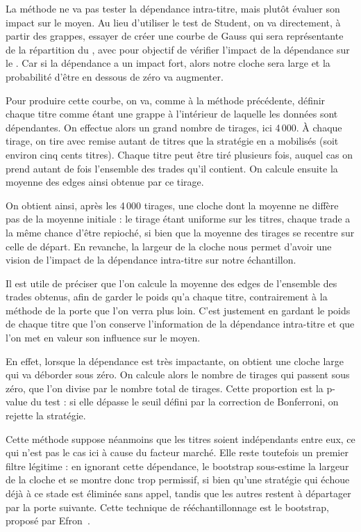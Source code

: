 La méthode ne va pas tester la dépendance intra-titre,
mais plutôt évaluer son impact sur le \edgevar{} moyen.
Au lieu d'utiliser le test de Student, on va directement, à partir des
grappes, essayer de créer une courbe de Gauss qui sera représentante de la
répartition du \edgevar{}, avec pour objectif de vérifier l'impact de la dépendance
sur le \edgevar{}. Car si la dépendance a un impact fort, alors notre cloche sera
large et la probabilité d'être en dessous de zéro va augmenter.

Pour produire cette courbe, on va, comme à la méthode précédente, définir
chaque titre comme étant une grappe à l'intérieur de laquelle les données
sont dépendantes. On effectue alors un grand nombre de tirages, ici 4\,000.
À chaque tirage, on tire avec remise autant de titres que la stratégie en a
mobilisés (soit environ cinq cents titres). Chaque titre peut être tiré
plusieurs fois, auquel cas on prend autant de fois l'ensemble des trades
qu'il contient. On calcule ensuite la moyenne des edges ainsi obtenue par
ce tirage.

On obtient ainsi, après les 4\,000 tirages, une cloche dont la moyenne ne
diffère pas de la moyenne initiale : le tirage étant uniforme sur les titres,
chaque trade a la même chance d'être repioché, si bien que la moyenne des
tirages se recentre sur celle de départ. En revanche, la largeur de la cloche
nous permet d'avoir une vision de l'impact de la dépendance intra-titre sur
notre échantillon.

Il est utile de préciser que l'on calcule la moyenne des edges de l'ensemble
des trades obtenus, afin de garder le poids qu'a chaque titre, contrairement
à la méthode de la porte que l'on verra plus loin. C'est justement en
gardant le poids de chaque titre que l'on conserve l'information de la
dépendance intra-titre et que l'on met en valeur son influence sur le \edgevar{}
moyen.

En effet, lorsque la dépendance est très impactante, on obtient une cloche
large qui va déborder sous zéro. On calcule alors le nombre de tirages qui
passent sous zéro, que l'on divise par le nombre total de tirages. Cette
proportion est la p-value du test : si elle dépasse le seuil défini par la
correction de Bonferroni, on rejette la stratégie.

Cette méthode suppose néanmoins que les titres soient indépendants entre
eux, ce qui n'est pas le cas ici à cause du facteur marché. Elle reste
toutefois un premier filtre légitime : en ignorant cette dépendance, le
bootstrap sous-estime la largeur de la cloche et se montre donc trop
permissif, si bien qu'une stratégie qui échoue déjà à ce stade est éliminée
sans appel, tandis que les autres restent à départager par la porte suivante.
Cette technique de rééchantillonnage est le bootstrap, proposé par
Efron~\cite{efron1979}.

